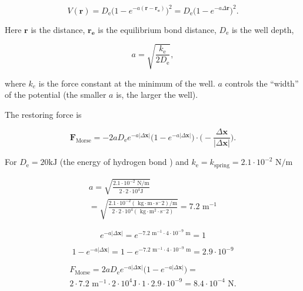 \begin{equation}
V(\mathbf{r}) = D_{\text{e}} \big(1 - e^{- a(\mathbf{r - r_e})}\big)^2 = D_{\text{e}} \big(1 - e^{- a \Delta \mathbf{r}}\big)^2.
\end{equation}

Here $\mathbf{r}$ is the distance, $\mathbf{r_e}$ is the equilibrium bond distance, $D_{\text{e}}$ is the well depth,

\begin{equation}
a=\sqrt {\frac{k_{\text{e}}}{2D_{\text{e}}}},
\end{equation}

where $k_e$ is the force constant at the minimum of the well. $a$ controls the ``width'' of the potential (the smaller $a$ is, the larger the well).

The restoring force is

\begin{equation}
\mathbf{F}_\text{Morse} = - 2a D_{\text{e}}e^{- a |\Delta \mathbf{x}|}\big(1 - e^{- a |\Delta \mathbf{x}|}\big) \cdot \big(- \frac{\Delta \mathbf{x}}{|\Delta \mathbf{x}|}\big).
\end{equation}

For $D_{\text{e}} = 20 \text{kJ}$ (the energy of hydrogen bond \cite{mcnaught1997compendium}) and $k_{\text{e}} = k_{\text{spring}} = 2.1 \cdot 10^{-2} \text{ N}/\text{m}$

\begin{equation}
\begin{split}
a = \sqrt {\frac{2.1 \cdot 10^{-2} \text{ N}/\text{m}}{2 \cdot 2 \cdot 10^{4} \text{J}}}\\
= \sqrt {\frac{2.1 \cdot 10^{-2} (\text{ kg} \cdot \text{m} \cdot \text{s}^-2)/\text{m}}{2 \cdot 2 \cdot 10^{4} (\text{ kg} \cdot \text{m}^2 \cdot \text{s}^-2)}} = 7.2 \text{ m}^{-1}
\end{split}
\end{equation}

\begin{equation}
e^{- a |\Delta \mathbf{x}|} = e^{- 7.2 \text{ m}^{-1} \cdot 4 \cdot 10^{-9} \text{ m}} = 1
\end{equation}

\begin{equation}
1 - e^{- a |\Delta \mathbf{x}|} = 1 - e^{- 7.2 \text{ m}^{-1} \cdot 4 \cdot 10^{-9} \text{ m}} = 2.9 \cdot 10^{-9}
\end{equation}

\begin{equation}
\begin{split}
F_\text{Morse} = 2aD_{\text{e}}e^{- a |\Delta \mathbf{x}|}\big(1 - e^{- a |\Delta \mathbf{x}|}\big) =\\
2 \cdot 7.2 \text{ m}^{-1} \cdot 2 \cdot 10^{4} \text{J} \cdot 1 \cdot 2.9 \cdot 10^{-9} = 8.4 \cdot 10^{-4} \text{ N}.
\end{split}
\end{equation}

